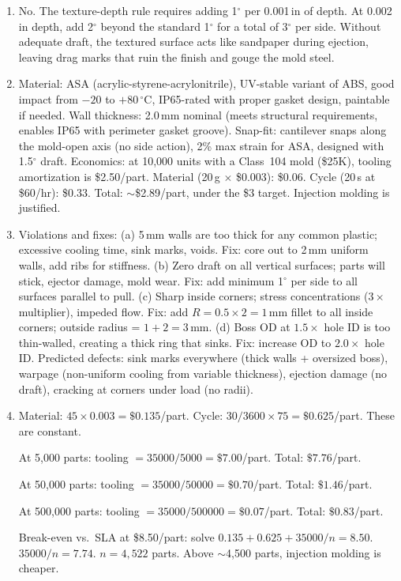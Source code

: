\documentclass[11pt,letterpaper,twoside,openany]{book}
\newcommand{\degC}{\ensuremath{{}^{\circ}\text{C}}}
\providecommand{\ang}[1]{#1\ensuremath{{}^{\circ}}}
\begin{document}
\begin{enumerate}[leftmargin=1.5em]
  \item No. The texture-depth rule requires adding \ang{1} per 0.001\,in of depth. At 0.002\,in depth, add \ang{2} beyond the standard \ang{1} for a total of \ang{3} per side. Without adequate draft, the textured surface acts like sandpaper during ejection, leaving drag marks that ruin the finish and gouge the mold steel.

  \item Material: ASA (acrylic-styrene-acrylonitrile), UV-stable variant of ABS, good impact from $-20$ to $+80$\,\degC, IP65-rated with proper gasket design, paintable if needed. Wall thickness: 2.0\,mm nominal (meets structural requirements, enables IP65 with perimeter gasket groove). Snap-fit: cantilever snaps along the mold-open axis (no side action), 2\% max strain for ASA, designed with \ang{1.5} draft. Economics: at 10,000 units with a Class~104 mold (\$25K), tooling amortization is \$2.50/part. Material (20\,g $\times$ \$0.003): \$0.06. Cycle (20\,s at \$60/hr): \$0.33. Total: $\sim$\$2.89/part, under the \$3 target. Injection molding is justified.

  \item Violations and fixes: (a) 5\,mm walls are too thick for any common plastic; excessive cooling time, sink marks, voids. Fix: core out to 2\,mm uniform walls, add ribs for stiffness. (b) Zero draft on all vertical surfaces; parts will stick, ejector damage, mold wear. Fix: add minimum \ang{1} per side to all surfaces parallel to pull. (c) Sharp inside corners; stress concentrations ($3\times$ multiplier), impeded flow. Fix: add $R = 0.5 \times 2 = 1$\,mm fillet to all inside corners; outside radius = $1 + 2 = 3$\,mm. (d) Boss OD at $1.5\times$ hole ID is too thin-walled, creating a thick ring that sinks. Fix: increase OD to $2.0\times$ hole ID. Predicted defects: sink marks everywhere (thick walls + oversized boss), warpage (non-uniform cooling from variable thickness), ejection damage (no draft), cracking at corners under load (no radii).

  \item Material: $45 \times 0.003 = \$0.135$/part. Cycle: $30/3600 \times 75 = \$0.625$/part. These are constant.

  At 5,000 parts: tooling $= 35000/5000 = \$7.00$/part. Total: $\$7.76$/part.

  At 50,000 parts: tooling $= 35000/50000 = \$0.70$/part. Total: $\$1.46$/part.

  At 500,000 parts: tooling $= 35000/500000 = \$0.07$/part. Total: $\$0.83$/part.

  Break-even vs.\ SLA at \$8.50/part: solve $0.135 + 0.625 + 35000/n = 8.50$. $35000/n = 7.74$. $n = 4,522$ parts. Above $\sim$4,500 parts, injection molding is cheaper.
\end{enumerate}
\end{document}
